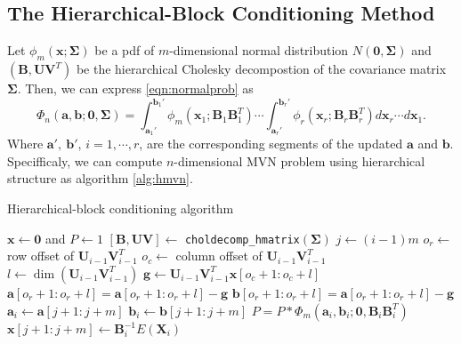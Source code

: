 \subsection{The Hierarchical-Block Conditioning Method}

Let $\phi_m(\mathbf{x}; \boldsymbol{\Sigma})$ be a pdf of $m$-dimensional normal distribution $N(\mathbf{0}, \boldsymbol{\Sigma})$ and $(\mathbf{B}, \mathbf{U}\mathbf{V}^T)$ be the hierarchical Cholesky decompostion of the covariance matrix $\boldsymbol{\Sigma}$. Then, we can express \eqref{eqn:normalprob} as 
\begin{equation}\label{eqn:hmvn}
    \Phi_n(\mathbf{a}, \mathbf{b}; \mathbf{0}, \boldsymbol{\Sigma}) 
    = \int_{\mathbf{a}_1'}^{\mathbf{b}_1'} \phi_m(\mathbf{x}_1; \mathbf{B}_1\mathbf{B}_1^T) 
    \cdots 
    \int_{\mathbf{a}_r'}^{\mathbf{b}_r'} \phi_r(\mathbf{x}_r; \mathbf{B}_r\mathbf{B}_r^T) d\mathbf{x}_r \cdots d\mathbf{x}_1.
\end{equation}
Where $\mathbf{a}',~\mathbf{b}'$, $i=1,\cdots,r$, are the corresponding segments of the updated $\mathbf{a}$ and $\mathbf{b}$. Specifficaly, we can compute $n$-dimensional MVN problem using hierarchical structure as algorithm \ref{alg:hmvn}.

\begin{algorithm}[ht]
    \caption{Hierarchical-block conditioning algorithm}
    \begin{algorithmic}[1]
    
        \State $\mathbf{x} \leftarrow \mathbf{0}$ and $P \leftarrow 1$
        \State $[\mathbf{B}, \mathbf{UV}] \leftarrow$ \texttt{choldecomp\_hmatrix}$(\boldsymbol{\Sigma})$
            \State $j \leftarrow (i-1)m$
                \State $o_r \leftarrow$ row offset of $\mathbf{U}_{i-1}\mathbf{V}_{i-1}^T$
                \State $o_c \leftarrow$ column offset of $\mathbf{U}_{i-1}\mathbf{V}_{i-1}^T$
                \State $l \leftarrow \dim(\mathbf{U}_{i-1}\mathbf{V}_{i-1}^T)$
                \State $\mathbf{g} \leftarrow \mathbf{U}_{i-1}\mathbf{V}_{i-1}^T\mathbf{x}[o_c+1:o_c+l]$
                \State $\mathbf{a}[o_r+1:o_r+l] = \mathbf{a}[o_r+1:o_r+l] - \mathbf{g}$
                \State $\mathbf{b}[o_r+1:o_r+l] = \mathbf{a}[o_r+1:o_r+l] - \mathbf{g}$
            \EndIf
            \State $\mathbf{a}_i \leftarrow \mathbf{a}[j+1:j+m]$
            \State $\mathbf{b}_i \leftarrow \mathbf{b}[j+1:j+m]$
            \State $P = P*\Phi_m(\mathbf{a}_i, \mathbf{b}_i; \mathbf{0}, \mathbf{B}_i\mathbf{B}_i^T)$
            \State $\mathbf{x}[j+1:j+m] \leftarrow \mathbf{B}_{i}^{-1} E(\mathbf{X}_i)$
        \EndFor
    \EndProcedure

    \end{algorithmic}\label{alg:hmvn}
\end{algorithm}

